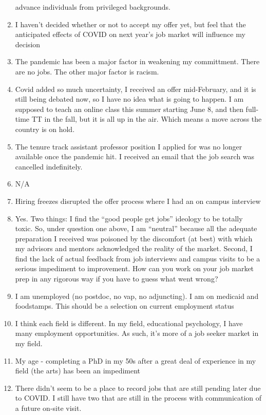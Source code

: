 \documentclass[]{article}
\begin{document}
\begin{enumerate}
  advance individuals from privileged backgrounds.
\item
  I haven't decided whether or not to accept my offer yet, but feel that
  the anticipated effects of COVID on next year's job market will
  influence my decision
\item
  The pandemic has been a major factor in weakening my committment.
  There are no jobs. The other major factor is racism.
\item
  Covid added so much uncertainty, I received an offer mid-February, and
  it is still being debated now, so I have no idea what is going to
  happen. I am supposed to teach an online class this summer starting
  June 8, and then full-time TT in the fall, but it is all up in the
  air. Which means a move across the country is on hold.
\item
  The tenure track assistant professor position I applied for was no
  longer available once the pandemic hit. I received an email that the
  job search was cancelled indefinitely.
\item
  N/A
\item
  Hiring freezes disrupted the offer process where I had an on campus
  interview
\item
  Yes. Two things: I find the ``good people get jobs'' ideology to be
  totally toxic. So, under question one above, I am ``neutral'' because
  all the adequate preparation I received was poisoned by the discomfort
  (at best) with which my advisors and mentors acknowledged the reality
  of the market. Second, I find the lack of actual feedback from job
  interviews and campus visits to be a serious impediment to
  improvement. How can you work on your job market prep in any rigorous
  way if you have to guess what went wrong?
\item
  I am unemployed (no postdoc, no vap, no adjuncting). I am on medicaid
  and foodstamps. This should be a selection on current employment
  status
\item
  I think each field is different. In my field, educational psychology,
  I have many employment opportunities. As such, it's more of a job
  seeker market in my field.
\item
  My age - completing a PhD in my 50s after a great deal of experience
  in my field (the arts) has been an impediment
\item
  There didn't seem to be a place to record jobs that are still pending
  later due to COVID. I still have two that are still in the process
  with communication of a future on-site visit.

\end{enumerate}
\end{document}
